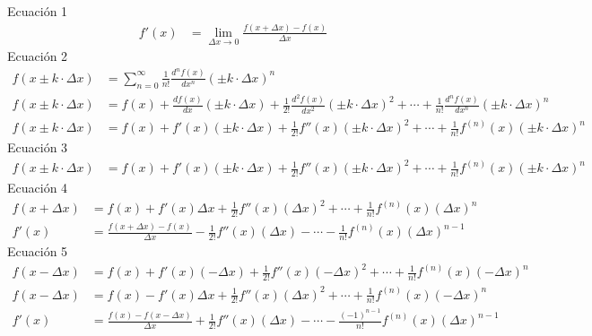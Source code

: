 \documentclass{article}
\begin{document}
Ecuación 1
\begin{equation*}
    \begin{aligned}
        f'(x) &= \lim_{\Delta x\rightarrow0}\frac{f(x+\Delta x)-f(x)}{\Delta x}
    \end{aligned}
\end{equation*}
Ecuación 2
\scriptsize
\begin{equation*}
    \begin{aligned}
        f(x\pm k\cdot\Delta x) & = \sum^{\infty}_{n=0}\frac{1}{n!}\frac{d^{n}f(x)}{dx^{n}}\left(\pm k\cdot\Delta x\right)^{n}
        \\
        f(x\pm k\cdot\Delta x) & = f(x) + \frac{df(x)}{dx}\left(\pm k\cdot\Delta x\right) + \frac{1}{2!}\frac{d^{2}f(x)}{dx^{2}}\left(\pm k\cdot\Delta x\right)^{2} + \cdots + \frac{1}{n!}\frac{d^{n}f(x)}{dx^{n}}\left(\pm k\cdot\Delta x\right)^{n}
        \\
        f(x\pm k\cdot\Delta x) & = f(x) + f'(x)\left(\pm k\cdot\Delta x\right) + \frac{1}{2!}f''(x)\left(\pm k\cdot\Delta x\right)^{2} + \cdots + \frac{1}{n!}f^{(n)}(x)\left(\pm k\cdot\Delta x\right)^{n}
    \end{aligned}
\end{equation*}
\normalsize
Ecuación 3
\scriptsize
\begin{equation*}
    \begin{aligned}
        f(x\pm k\cdot\Delta x) & = f(x) + f'(x)\left(\pm k\cdot\Delta x\right) + \frac{1}{2!}f''(x)\left(\pm k\cdot\Delta x\right)^{2} + \cdots + \frac{1}{n!}f^{(n)}(x)\left(\pm k\cdot\Delta x\right)^{n}
    \end{aligned}
\end{equation*}
\normalsize
Ecuación 4
\begin{equation*}
    \begin{aligned}
        f(x+\Delta x) & = f(x) + f'(x)\Delta x + \frac{1}{2!}f''(x)\left(\Delta x\right)^{2} + \cdots + \frac{1}{n!}f^{(n)}(x)\left(\Delta x\right)^{n}
        \\
        f'(x) & = \frac{f(x+\Delta x)-f(x)}{\Delta x} - \frac{1}{2!}f''(x)\left(\Delta x\right) - \cdots - \frac{1}{n!}f^{(n)}(x)\left(\Delta x\right)^{n-1}
    \end{aligned}
\end{equation*}
Ecuación 5
\small
\begin{equation*}
    \begin{aligned}
        f(x-\Delta x) & = f(x) + f'(x)\left(-\Delta x\right) + \frac{1}{2!}f''(x)\left(-\Delta x\right)^{2} + \cdots + \frac{1}{n!}f^{(n)}(x)\left(-\Delta x\right)^{n}
        \\
        f(x-\Delta x) & = f(x) - f'(x)\Delta x + \frac{1}{2!}f''(x)\left(\Delta x\right)^{2} + \cdots + \frac{1}{n!}f^{(n)}(x)\left(-\Delta x\right)^{n}
        \\
        f'(x) & = \frac{f(x)-f(x-\Delta x)}{\Delta x} + \frac{1}{2!}f''(x)\left(\Delta x\right) - \cdots - \frac{(-1)^{n-1}}{n!}f^{(n)}(x)\left(\Delta x\right)^{n-1}
    \end{aligned}
\end{equation*}
\end{document}
